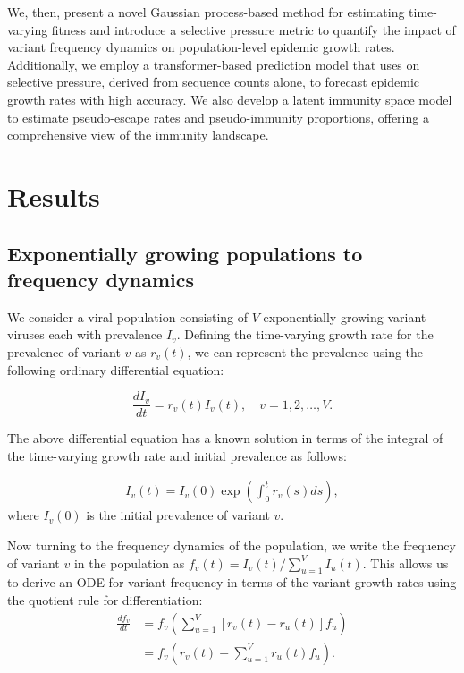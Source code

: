 \documentclass[12pt,oneside,letterpaper]{article}
\begin{document}
We, then, present a novel Gaussian process-based method for estimating time-varying fitness and introduce a selective pressure metric to quantify the impact of variant frequency dynamics on population-level epidemic growth rates. 
Additionally, we employ a transformer-based prediction model that uses on selective pressure, derived from sequence counts alone, to forecast epidemic growth rates with high accuracy. 
We also develop a latent immunity space model to estimate pseudo-escape rates and pseudo-immunity proportions, offering a comprehensive view of the immunity landscape.

\section*{Results}

\subsection*{Exponentially growing populations to frequency dynamics}%

We consider a viral population consisting of $V$ exponentially-growing variant viruses each with prevalence $I_{v}$.
Defining the time-varying growth rate for the prevalence of variant $v$ as $r_{v}(t)$, we can represent the prevalence using the following ordinary differential equation:

\begin{equation} \label{eq:inhomo_exp_growth}
    \frac{d I_{v}}{d t} = r_{v}(t) I_{v}(t), \quad v = 1,2, \ldots, V.
\end{equation}

The above differential equation has a known solution in terms of the integral of the time-varying growth rate and initial prevalence as follows:

\begin{align*}
I_{v}(t) = I_{v}(0) \exp\left( \int_{0}^{t} r_{v}(s) ds\right),
\end{align*}
where $I_{v}(0)$ is the initial prevalence of variant $v$.

Now turning to the frequency dynamics of the population, we write the frequency of variant $v$ in the population as  $f_{v}(t) = I_{v}(t) / \sum_{u=1}^{V} I_{u}(t)$.
This allows us to derive an ODE for variant frequency in terms of the variant growth rates using the quotient rule for differentiation:
\begin{align*}
    \frac{d f_{v}}{d t} &= f_{v} \left( \sum_{u=1}^{V} [r_{v}(t) - r_{u}(t)] f_{u} \right)\\
                        &= f_{v} \left( r_{v}(t) - \sum_{u=1}^{V} r_{u}(t) f_{u} \right).
\end{align*}
\end{document}
